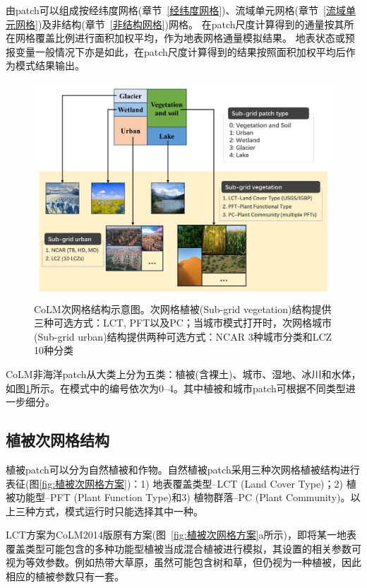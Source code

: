 由patch可以组成按经纬度网格(章节~\ref{经纬度网格})、流域单元网格(章节~\ref{流域单元网格})及非结构(章节~\ref{非结构网格})网格。
在patch尺度计算得到的通量按其所在网格覆盖比例进行面积加权平均，作为地表网格通量模拟结果。
地表状态或预报变量一般情况下亦是如此，在patch尺度计算得到的结果按照面积加权平均后作为模式结果输出。

{
\begin{figure}[htbp]
\centering
\includegraphics[width=\textwidth]{Figures/模式构架/CoLM次网格结构示意图-v2.jpg}
\caption{CoLM次网格结构示意图。次网格植被(Sub-grid vegetation)结构提供三种可选方式：LCT, PFT以及PC；当城市模式打开时，次网格城市(Sub-grid urban)结构提供两种可选方式：NCAR 3种城市分类和LCZ 10种分类}
\label{fig:次网格结构示意图}
\end{figure}
}


CoLM非海洋patch从大类上分为五类：植被(含裸土)、城市、湿地、冰川和水体，如图\ref{fig:次网格结构示意图}所示。在模式中的编号依次为0--4。其中植被和城市patch可根据不同类型进一步细分。

\subsection{植被次网格结构}
植被patch可以分为自然植被和作物。自然植被patch采用三种次网格植被结构进行表征(图\ref{fig:植被次网格方案})：1) 地表覆盖类型--LCT (Land Cover Type)；2) 植被功能型--PFT (Plant Function Type)和3) 植物群落--PC (Plant Community)。以上三种方式，模式运行时只能选择其中一种。

LCT方案为CoLM2014版原有方案(图~\ref{fig:植被次网格方案}a所示)，即将某一地表覆盖类型可能包含的多种功能型植被当成混合植被进行模拟，其设置的相关参数可视为等效参数。例如热带大草原，虽然可能包含树和草，但仍视为一种植被，因此相应的植被参数只有一套。

